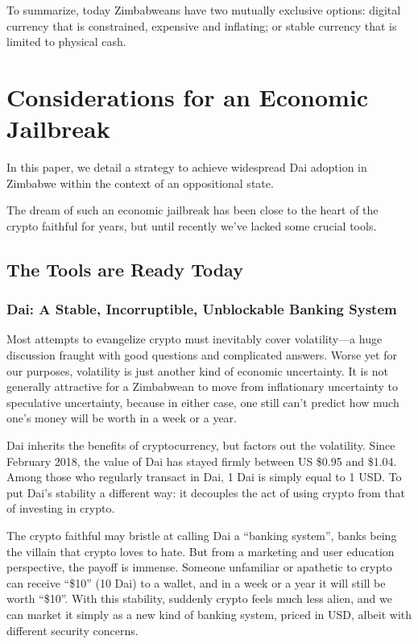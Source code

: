 \documentclass{article}
\begin{document}
To summarize, today Zimbabweans have two mutually exclusive options: digital currency that is constrained, expensive and inflating; or stable currency that is limited to physical cash.

\newpage
\section{Considerations for an Economic Jailbreak} \label{jailbreak}

In this paper, we detail a strategy to achieve widespread Dai adoption in Zimbabwe within the context of an oppositional state.

The dream of such an economic jailbreak has been close to the heart of the crypto faithful for years, but until recently we've lacked some crucial tools.

\subsection{The Tools are Ready Today} \label{tools}

\subsubsection{Dai: A Stable, Incorruptible, Unblockable Banking System} \label{dai}

Most attempts to evangelize crypto must inevitably cover volatility---a huge discussion fraught with good questions and complicated answers. Worse yet for our purposes, volatility is just another kind of economic uncertainty. It is not generally attractive for a Zimbabwean to move from inflationary uncertainty to speculative uncertainty, because in either case, one still can't predict how much one's money will be worth in a week or a year.

Dai inherits the benefits of cryptocurrency, but factors out the volatility. Since February 2018, the value of Dai has stayed firmly between US \$0.95 and \$1.04. Among those who regularly transact in Dai, 1 Dai is simply equal to 1 USD. To put Dai's stability a different way: it decouples the act of using crypto from that of investing in crypto.

The crypto faithful may bristle at calling Dai a ``banking system'', banks being the villain that crypto loves to hate. But from a marketing and user education perspective, the payoff is immense. Someone unfamiliar or apathetic to crypto can receive ``\$10'' (10 Dai) to a wallet, and in a week or a year it will still be worth ``\$10''. With this stability, suddenly crypto feels much less alien, and we can market it simply as a new kind of banking system, priced in USD, albeit with different security concerns.
\end{document}
